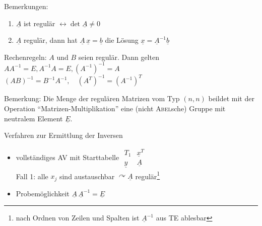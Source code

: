 \documentclass[a4paper]{scrartcl}
\begin{document}
Bemerkungen:
\begin{enumerate}
\item $\underline{A}$ ist regulär $\leftrightarrow \det{\underline{A}} \neq 0 $
\item $\underline{A}$ regulär, dann hat $\underline{A} \, \underline{x} = \underline{b}$ die Lösung $\underline{x} = \underline{A}^{-1} \underline{b}$
\end{enumerate}

Rechenregeln: $A$ und $B$ seien regulär. Dann gelten $A A^{-1} = E,  A^{-1} A = E, (A^{-1})^{-1} = A$\\
$(AB)^{-1} = B^{-1} A^{-1}, \quad (A^T)^{-1} = (A^{-1})^T$

Bemerkung: Die Menge der regulären Matrizen vom Typ $(n,n)$ beildet mit der Operation "`Matrizen-Multiplikation"' eine (nicht \textsc{Abel}sche) Gruppe mit neutralem Element $\underline{E}$.

Verfahren zur Ermittlung der Inversen
\begin{itemize}
\item vollständiges \textsc{AV} mit Starttabelle $\begin{array}{c|c} T_1 & \underline{x}^T \\ \hline \underline{y} & \underline{A} \end{array}$\\
Fall 1: alle $x_j$ sind austauschbar $\curvearrowright \underline{A}$ regulär\footnote{nach Ordnen von Zeilen und Spalten ist $\underline{A}^{-1}$ aus TE ablesbar}
\item Probemöglichkeit $\underline{A}\, \underline{A}^{-1} = \underline{E}$
\end{itemize}
\end{document}
